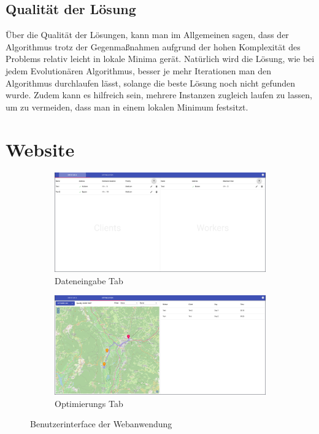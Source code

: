 \documentclass[a4paper,notitlepage,12pt]{report}
\begin{document}
\subsection{Qualität der Lösung}

Über die Qualität der Lösungen, kann man im Allgemeinen sagen, dass der
Algorithmus trotz der Gegenmaßnahmen aufgrund der hohen Komplexität des
Problems relativ leicht in lokale Minima gerät. Natürlich wird die Lösung,
wie bei jedem Evolutionären Algorithmus, besser je mehr Iterationen man
den Algorithmus durchlaufen lässt, solange die beste Lösung noch nicht
gefunden wurde. Zudem kann es hilfreich sein, mehrere Instanzen zugleich
laufen zu lassen, um zu vermeiden, dass man in einem lokalen Minimum
festsitzt.

\section{Website}

\begin{figure}[H]
    \centering
    \begin{subfigure}[b]{0.75\linewidth}
        \includegraphics[width=\linewidth]{website-input.png}
        \caption{Dateneingabe Tab}
        \label{fig:websiteData}
    \end{subfigure}
    \begin{subfigure}[b]{0.75\linewidth}
        \includegraphics[width=\linewidth]{website-optimization.png}
        \caption{Optimierungs Tab}
        \label{fig:websiteOptim}
    \end{subfigure}
    \caption{Benutzerinterface der Webanwendung}
    \label{fig:website}
\end{figure}
\end{document}
